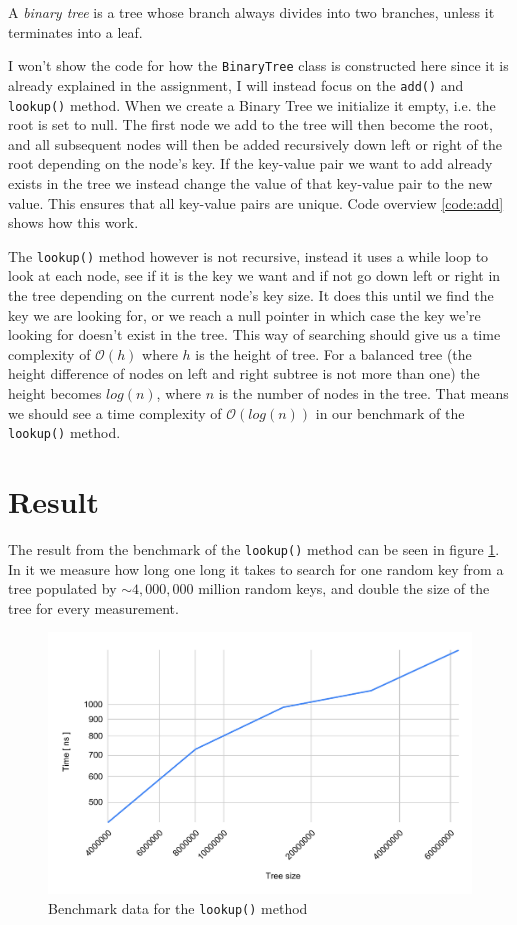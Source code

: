 \documentclass[a4paper,11pt]{article}
\begin{document}
A \textit{binary tree} is a tree whose branch always divides into two branches, unless it terminates
into a leaf.

I won't show the code for how the {\tt BinaryTree} class is constructed here since it
is already explained in the assignment, I will instead focus on the {\tt add()} and
    {\tt lookup()} method. When we create a Binary Tree we initialize it empty, i.e. the
root is set to null. The first node we add to the tree will then become the root, and
all subsequent nodes will then be added recursively down left or right of the root
depending on the node's key. If the key-value pair we want to add already exists in the
tree we instead change the value of that key-value pair to the new value. This ensures
that all key-value pairs are unique. Code overview \ref{code:add} shows how this work.

The {\tt lookup()} method however is not recursive, instead it uses a while loop to look
at each node, see if it is the key we want and if not go down left or right in the tree
depending on the current node's key size. It does this until we find the key we are looking
for, or we reach a null pointer in which case the key we're looking for doesn't exist in
the tree. This way of searching should give us a time complexity of $\mathcal{O}(h)$ where
$h$ is the height of tree. For a balanced tree (the height difference of nodes on
left and right subtree is not more than one) the height becomes $log(n)$, where $n$ is
the number of nodes in the tree. That means we should see a time complexity of
$\mathcal{O}(log(n))$ in our benchmark of the {\tt lookup()} method.




\section*{Result}
The result from the benchmark of the {\tt lookup()} method can be seen in figure \ref{fig:bench}.
In it we measure how long one long it takes to search for one random key from a tree
populated by $\sim4,000,000$ million random keys, and double the size of the tree for every measurement.
\begin{figure}[h]
    \centering
    \includegraphics[width=.8\textwidth]{benchmarkData.pdf}
    \caption{Benchmark data for the {\tt lookup()} method}
    \label{fig:bench}
\end{figure}
\end{document}
